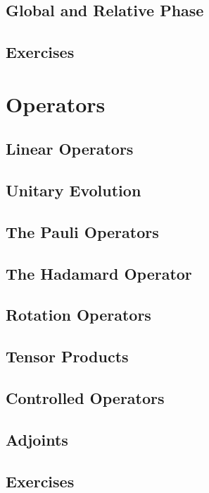 \documentclass[11pt,a4paper]{article}
\begin{document}
\subsection{Global and Relative Phase}

\subsection{Exercises}


\section{Operators}

\subsection{Linear Operators}

\subsection{Unitary Evolution}

\subsection{The Pauli Operators}

\subsection{The Hadamard Operator}

\subsection{Rotation Operators}

\subsection{Tensor Products}

\subsection{Controlled Operators}

\subsection{Adjoints}

\subsection{Exercises}
\end{document}
